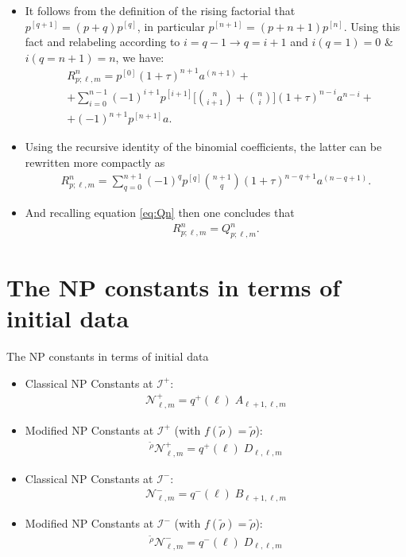 \documentclass{beamer}
\theoremstyle{remark}
\theoremstyle{plain}
\theoremstyle{plain}
\begin{document}
\begin{frame}
  \begin{itemize}
    \item It follows from the definition of the rising factorial that $p^{[q+1]}=(p+q)p^{[q]}$, in particular $p^{[n+1]}=(p+n+1)p^{[n]}$. Using this fact and relabeling according to $i = q-1 \rightarrow q = i+1$ and $i(q=1) = 0$ \& $i(q= n+1) = n$, we have:
    \begin{align}
      & R^{n}_{p;\ell,m} = p^{[0]}(1+\tau)^{n+1} a^{(n+1)}+ \nonumber \\
      & + \sum_{i=0}^{n-1}(-1)^{i+1} p^{[i+1]}\Biggl[{n \choose i+1} + {n \choose i}\Biggr](1+\tau)^{n-i} a^{n-i} + \nonumber \\
      & + (-1)^{n+1} p^{[n+1]} a.
    \end{align}
    \item Using the recursive identity of the binomial coefficients, the latter can be rewritten more compactly as
    \begin{align}
      R^{n}_{p;\ell,m} = \sum_{q=0}^{n+1}(-1)^{q} p^{[q]} {n+1 \choose q}(1+\tau)^{n-q+1}a^{(n-q+1)}.
    \end{align}
    \item And recalling equation \eqref{eq:Qn} then one concludes that
    \begin{align}\label{eq:RnIsQnplusone}
      R^{n}_ {p;\ell,m}=Q^{n}_{p;\ell,m}.
    \end{align}
  \end{itemize}
\end{frame}

\section{The NP constants in terms of initial data}
\begin{frame}{The NP constants in terms of initial data}
  \begin{itemize}
    \item Classical NP Constants at $\mathscr{I}^{+}$:
    \begin{align*}
      \mathcal{N}^{+}_{\ell,m} = q^{+}(\ell) \;A_{\ell+1,\ell,m}
    \end{align*}
    \item Modified NP Constants at $\mathscr{I}^{+}$ (with $f(\tilde{\rho})=\tilde{\rho}$):
    \begin{align*}
       {}^{\tilde{\rho}}\mathcal{N}^{+}_{\ell,m} = q^{+}(\ell) \;D_{\ell,\ell,m}
    \end{align*}
    \item Classical NP Constants at $\mathscr{I}^{-}$:
    \begin{align*}
      \mathcal{N}^{-}_{\ell,m} = q^{-}(\ell) \; B_{\ell+1,\ell,m}
    \end{align*}
    \item Modified NP Constants at $\mathscr{I}^{-}$ (with $f(\tilde{\rho})=\tilde{\rho}$):
    \begin{align*}
      {}^{\tilde{\rho}}\mathcal{N}^{-}_{\ell,m} = q^{-}(\ell) \;D_{\ell,\ell,m}
    \end{align*}
  \end{itemize}
\end{frame}
\end{document}
